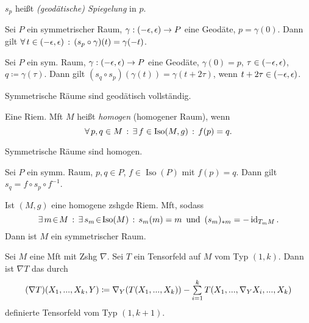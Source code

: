 \documentclass{cheat-sheet}
\newcommand{\vinterval}{\ointerval{-\epsilon}{\epsilon}} %
\DeclareMathOperator{\Iso}{Iso} %
\begin{document}
\begin{sprech}
  $s_p$ heißt \emph{(geodätische) Spiegelung} in $p$.
\end{sprech}

\begin{lem}
  Sei $P$ ein symmetrischer Raum, $\gamma : \vinterval \to P$ eine Geodäte, $p = \gamma(0)$. Dann gilt
  $\fa{t \in \vinterval} (s_p \circ \gamma)(t) = \gamma(-t)$.
\end{lem}

\begin{lem}
  Sei $P$ ein sym. Raum, $\gamma : \vinterval \to P$ eine Geodäte, $\gamma(0) = p$, $\tau \in \vinterval$, $q \coloneqq \gamma(\tau)$. Dann gilt $(s_q \circ s_p)(\gamma(t)) = \gamma(t + 2 \tau)$, wenn $t + 2 \tau \in \vinterval$.
\end{lem}

\begin{kor}
  Symmetrische Räume sind geodätisch vollständig.
\end{kor}

\begin{defn}
  Eine Riem. Mft $M$ heißt \emph{homogen} (homogener Raum), wenn
  \[ \fa{p, q \in M} \ex{f \in \Iso(M, g)} f(p) = q. \]
\end{defn}

\begin{lem}
  Symmetrische Räume sind homogen.
\end{lem}

\begin{lem}
  Sei $P$ ein symm. Raum, $p, q \in P$, $f \in \Iso(P)$ mit $f(p) = q$. Dann gilt $s_q = f \circ s_p \circ f^{-1}$.
\end{lem}

\begin{kor}
  Ist $(M, g)$ eine homogene zshgde Riem. Mft, sodass
  \[
    \ex{m \!\in\! M} \ex{s_m \!\in\! \Iso(M)} s_m(m) = m
    \enspace \text{und} \enspace
    (s_m)_{*m} = - \id_{T_m M}.
  \]
  Dann ist $M$ ein symmetrischer Raum.
\end{kor}

\begin{defn}
  Sei $M$ eine Mft mit Zshg $\nabla$. Sei $T$ ein Tensorfeld auf $M$ vom Typ $(1,k)$. Dann ist $\nabla T$ das durch
  \[
    (\nabla T)(X_1, \nldots, X_k, Y) \coloneqq \nabla_Y(T(X_1, \nldots, X_k)) - \sum_{i=1}^k T(X_1, \nldots, \nabla_Y X_i, \nldots, X_k)
  \]
  definierte Tensorfeld vom Typ $(1, k+1)$.
\end{defn}
\end{document}
